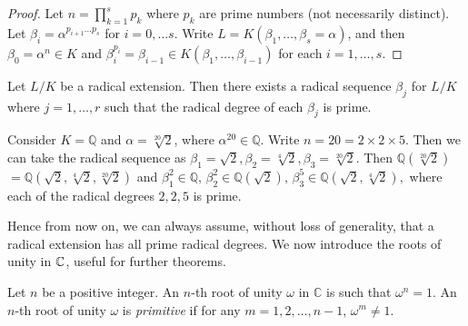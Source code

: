 \begin{proof}
	Let $n = \prod_{k=1}^{s} p_{k}$ where $p_{k}$ are prime numbers (not necessarily distinct). Let $\beta_{i} = \alpha^ {p_{i + 1} \dots  p_{s}}$ for $i = 0, \dots s$. Write $L = K(\beta_1,  \dots, \beta_s = \alpha)$, and then $\beta_0 = \alpha^n \in K$ and  $\beta_i ^ {p_i} = \beta_{i-1} \in K(\beta_1, \dots, \beta_{i - 1})$ for each $i  = 1, \dots, s$. 
\end{proof}



\begin{corollary} \label{thm:radical-all-prime}
	Let $L / K$ be a radical extension. Then there exists a radical sequence $\beta_j$ for $L / K$ where $j=1, \dots, r$ such that the radical degree of each $\beta_j$ is prime.
\end{corollary}

\begin{example} \label{exm:radical-sequence-prime}
	Consider $K  = \mathbb Q$ and $\alpha = \sqrt[20]{2}$, where $\alpha ^ {20} \in \mathbb Q$. Write $n = 20 =  2 \times 2 \times 5 $. Then we can take the radical sequence as $\beta_1 = \sqrt 2, \beta_2 = \sqrt[4]{2}, \beta_3 = \sqrt[20]{2}$. Then $\mathbb Q(\sqrt[20]{2}) $ $= \mathbb Q(\sqrt{2}, \sqrt[4]{2}, \sqrt[20]{2})$ and 
	$
	\beta_1 ^ 2 \in \mathbb Q, \, \beta_2 ^ 2 \in \mathbb Q(\sqrt{2}), \, \beta_3^5 \in \mathbb Q (\sqrt{2}, \sqrt[4]{2}),
	$
	where each of the radical degrees $2, 2, 5$ is prime.
\end{example}

Hence from now on, we can always assume, without loss of generality, that a radical extension has all prime radical degrees. We now introduce the roots of unity in $\mathbb C$, useful for further theorems. 


\begin{definition}
	Let $n$ be a positive integer. An $n$-th root of unity $\omega$ in $\mathbb C$ is such that $\omega ^ n = 1$. An $n$-th root of unity $\omega$ is \textit{primitive} if for any $m = 1, 2, \dots, n - 1$, $\omega ^ m \neq 1$.
\end{definition}


